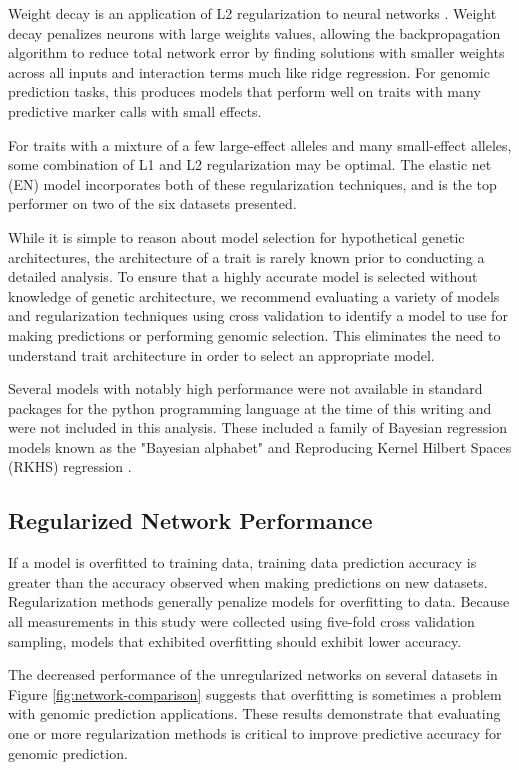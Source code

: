 Weight decay is an application of L2 regularization to neural networks 
\citep{krogh1992}. Weight decay penalizes neurons with large weights values, 
allowing the backpropagation algorithm to reduce total network error by finding 
solutions with smaller weights across all inputs and interaction terms much like
ridge regression. For genomic prediction tasks, this produces models 
that perform well on traits with many predictive marker calls with small effects. 

For traits with a mixture of a few large-effect alleles and many small-effect
alleles, some combination of L1 and L2 regularization may be optimal. 
The elastic net (EN) model incorporates both of these regularization
techniques, and is the top performer on two of the six datasets presented.

While it is simple to reason about model selection for hypothetical 
genetic architectures, the architecture of a trait is rarely known prior to 
conducting a detailed analysis. To ensure that a highly accurate 
model is selected without knowledge of genetic architecture, 
we recommend evaluating a variety of models and regularization 
techniques using cross validation to identify a model to use for 
making predictions or performing genomic selection. This eliminates 
the need to understand trait architecture in order to select an appropriate 
model.

Several models with notably high performance were not available in standard packages for
the python programming language at the time of this writing and were not included 
in this analysis. These included a family of Bayesian regression models known 
as the "Bayesian alphabet" \citep{gianola2009} and Reproducing Kernel Hilbert 
Spaces (RKHS) regression \citep{gianola2006}.

\subsection*{Regularized Network Performance}

If a model is overfitted to training data, training data prediction accuracy is greater than 
the accuracy observed when making predictions on new datasets. Regularization methods
generally penalize models for overfitting to data. Because all measurements in this study 
were collected using five-fold cross validation sampling, models that exhibited overfitting 
should exhibit lower accuracy.

The decreased performance of the unregularized networks on several datasets in Figure 
\ref{fig:network-comparison} suggests that overfitting is sometimes a problem with 
genomic prediction applications. These results demonstrate that evaluating one 
or more regularization methods is critical to improve predictive accuracy for 
genomic prediction.

